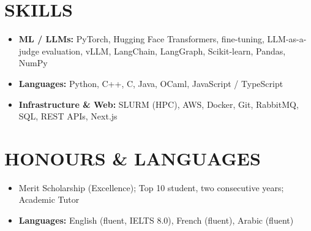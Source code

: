 \documentclass[10pt, a4paper]{article}
\begin{document}
\section*{SKILLS}
\begin{itemize}
    \item \textbf{ML / LLMs:} PyTorch, Hugging Face Transformers, fine-tuning, LLM-as-a-judge evaluation, vLLM, LangChain, LangGraph, Scikit-learn, Pandas, NumPy
    \item \textbf{Languages:} Python, C++, C, Java, OCaml, JavaScript / TypeScript
    \item \textbf{Infrastructure \& Web:} SLURM (HPC), AWS, Docker, Git, RabbitMQ, SQL, REST APIs, Next.js
\end{itemize}

\section*{HONOURS \& LANGUAGES}
\begin{itemize}
    \item Merit Scholarship (Excellence); Top 10 student, two consecutive years; Academic Tutor
    \item \textbf{Languages:} English (fluent, IELTS 8.0), French (fluent), Arabic (fluent)
\end{itemize}
\end{document}
